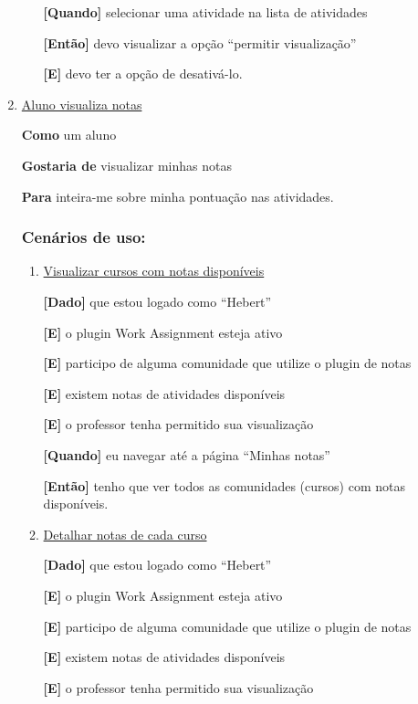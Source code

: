 \begin{enumerate}
\begin{enumerate}
\textbf{[Quando]} selecionar uma atividade na lista de atividades

\textbf{[Então]} devo visualizar a opção ``permitir visualização''

\textbf{[E]} devo ter a opção de desativá-lo.

\end{enumerate}

\item \underline{Aluno visualiza notas}

\textbf{Como} um aluno

\textbf{Gostaria de} visualizar minhas notas

\textbf{Para} inteira-me sobre minha pontuação nas atividades.

\subsubsection*{Cenários de uso:}
\begin{enumerate}

\item \underline{Visualizar cursos com notas disponíveis}

\textbf{[Dado]} que estou logado como ``Hebert''

\textbf{[E]} o plugin Work Assignment esteja ativo

\textbf{[E]} participo de alguma comunidade que utilize o plugin de notas

\textbf{[E]} existem notas de atividades disponíveis

\textbf{[E]} o professor tenha permitido sua visualização

\textbf{[Quando]} eu navegar até a página ``Minhas notas''

\textbf{[Então]} tenho que ver todos as comunidades (cursos) com notas disponíveis.

\item \underline{Detalhar notas de cada curso}

\textbf{[Dado]} que estou logado como ``Hebert''

\textbf{[E]} o plugin Work Assignment esteja ativo

\textbf{[E]} participo de alguma comunidade que utilize o plugin de notas

\textbf{[E]} existem notas de atividades disponíveis

\textbf{[E]} o professor tenha permitido sua visualização


\end{enumerate}
\end{enumerate}
